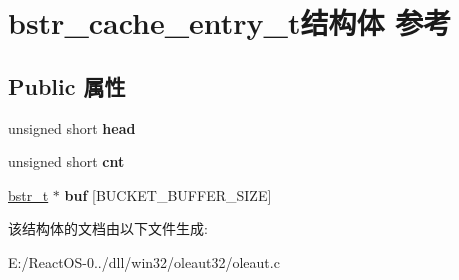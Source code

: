 \hypertarget{structbstr__cache__entry__t}{}\section{bstr\+\_\+cache\+\_\+entry\+\_\+t结构体 参考}
\label{structbstr__cache__entry__t}
\subsection*{Public 属性}
\begin{DoxyCompactItemize}
\item 
\mbox{\label{structbstr__cache__entry__t_a3121730b4e595dbef0710d2b630638a9}} 
unsigned short {\bfseries head}
\item 
\mbox{\label{structbstr__cache__entry__t_a7c6ba8812ae75374113795c4f344250e}} 
unsigned short {\bfseries cnt}
\item 
\mbox{\label{structbstr__cache__entry__t_af1457f8137f28429ca36800861e9e883}} 
\hyperlink{structbstr__t}{bstr\+\_\+t} $\ast$ {\bfseries buf} \mbox{[}B\+U\+C\+K\+E\+T\+\_\+\+B\+U\+F\+F\+E\+R\+\_\+\+S\+I\+ZE\mbox{]}
\end{DoxyCompactItemize}


该结构体的文档由以下文件生成\+:\begin{DoxyCompactItemize}
\item 
E\+:/\+React\+O\+S-\/0../dll/win32/oleaut32/oleaut.\+c\end{DoxyCompactItemize}
